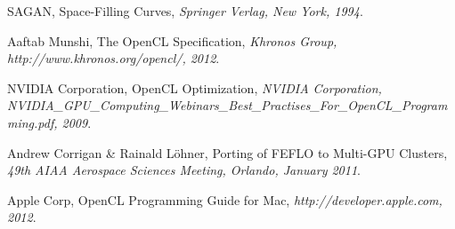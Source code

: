 \documentclass[a4paper,12pt]{article}
\begin{document}
%
%


\begin{thebibliography}{99}
\small

	SAGAN,
	Space-Filling Curves,
	\emph{Springer Verlag, New York, 1994}.

	Aaftab Munshi,
	The OpenCL Specification,
	\emph{Khronos Group, http://www.khronos.org/opencl/, 2012}.

	NVIDIA Corporation,
	OpenCL Optimization,
	\emph{NVIDIA Corporation, NVIDIA\_GPU\_Computing\_Webinars\_Best\_Practises\_For\_OpenCL\_Programming.pdf, 2009}.

	Andrew Corrigan \& Rainald Löhner,
	Porting of FEFLO to Multi-GPU Clusters,
	\emph{49th AIAA Aerospace Sciences Meeting, Orlando, January 2011}.

	Apple Corp,
	OpenCL Programming Guide for Mac,
	\emph{http://developer.apple.com, 2012}.



\end{thebibliography}
\end{document}
